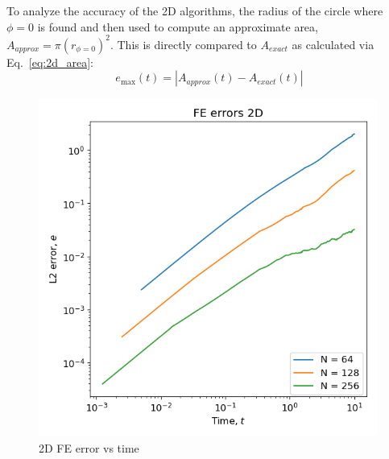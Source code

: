 \documentclass[12pt]{article}
\newcommand{\refeq}[1]{Eq.~\eqref{#1}}
\begin{document}
To analyze the accuracy of the 2D algorithms, the radius of the circle where $\phi = 0$ is found and then used to compute an approximate area, $A_{approx} = \pi (r_{\phi=0})^2$.
This is directly compared to $A_{exact}$ as calculated via \refeq{eq:2d_area}:
\begin{equation}
    e_{\text{max}}(t) = |A_{approx}(t) - A_{exact}(t)| \label{eq:2d_error}
\end{equation}
\begin{figure}
    \centering
    \begin{minipage}{0.3\textwidth}
        \centering
        \includegraphics[width=0.99\textwidth]{../figures/FE_errors_2D.png}
        \caption{2D FE error vs time}
        \label{fig:2d_fe_err}
    \end{minipage}\hfill
    \begin{minipage}{0.3\textwidth}
        \centering

\end{minipage}
\end{figure}
\end{document}

